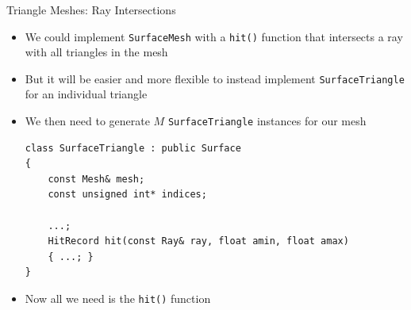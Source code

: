 \documentclass[utf8,stillsansserifmath,fleqn,t]{beamer}
\newcommand{\code}[1]{\texttt{#1}}
\begin{document}
\begin{frame}[fragile,label=triangle-mesh-1]
\frametitle{\insertsection}
Triangle Meshes: Ray Intersections
\begin{itemize}
\item We could implement \code{SurfaceMesh} with a \code{hit()} function
that intersects a ray with all triangles in the mesh
\item But it will be easier and more flexible to instead implement
\code{SurfaceTriangle} for an individual triangle
\item We then need to generate $M$ \code{SurfaceTriangle} instances
for our mesh
\begin{lstlisting}
class SurfaceTriangle : public Surface
{
    const Mesh& mesh;
    const unsigned int* indices;

    ...;
    HitRecord hit(const Ray& ray, float amin, float amax)
    { ...; }
}
\end{lstlisting}
\item Now all we need is the \code{hit()} function
\end{itemize}
\end{frame}
\end{document}
